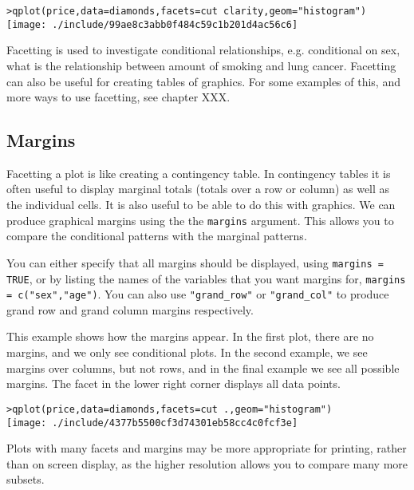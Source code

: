 \begin{alltt}
> qplot(price, data = diamonds, facets = cut ~ clarity, geom = "histogram")
\texttt{[image: ./include/99ae8c3abb0f484c59c1b201d4ac56c6]}

\end{alltt}

Facetting is used to investigate conditional relationships, e.g. conditional on sex, what is the relationship between amount of smoking and lung cancer.  Facetting can also be useful for creating tables of graphics.  For some examples of this, and more ways to use facetting, see chapter XXX.

\subsection{Margins}\label{sub:margins}

Facetting a plot is like creating a contingency table.  In contingency tables it is often useful to display marginal totals (totals over a row or column) as well as the individual cells.  It is also useful to be able to do this with graphics.  We can produce graphical margins using the the {\tt margins} argument.  This allows you to compare the conditional patterns with the marginal patterns.

You can either specify that all margins should be displayed, using {\tt margins = TRUE}, or by listing the names of the variables that you want margins for, {\tt margins = c("sex","age")}.  You can also use \verb|"grand_row"| or \verb|"grand_col"| to produce grand row and grand column margins respectively.

This example shows how the margins appear.  In the first plot, there are no margins, and we only see conditional plots.  In the second example, we see margins over columns, but not rows, and in the final example we see all possible margins.  The facet in the lower right corner displays all data points.

\begin{alltt}
> qplot(price, data = diamonds, facets = cut ~ ., geom = "histogram")
\texttt{[image: ./include/4377b5500cf3d74301eb58cc4c0fcf3e]}

\end{alltt}

Plots with many facets and margins may be more appropriate for printing, rather than on screen display, as the higher resolution allows you to compare many more subsets.

